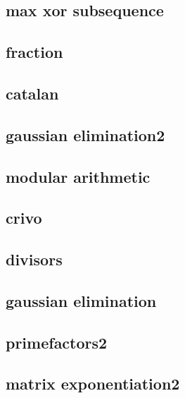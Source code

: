 \subsection{max xor subsequence}
\raggedbottom
\hrulefill
\subsection{fraction}
\raggedbottom
\hrulefill
\subsection{catalan}
\raggedbottom
\hrulefill
\subsection{gaussian elimination2}
\raggedbottom
\hrulefill
\subsection{modular arithmetic}
\raggedbottom
\hrulefill
\subsection{crivo}
\raggedbottom
\hrulefill
\subsection{divisors}
\raggedbottom
\hrulefill
\subsection{gaussian elimination}
\raggedbottom
\hrulefill
\subsection{primefactors2}
\raggedbottom
\hrulefill
\subsection{matrix exponentiation2}
\raggedbottom
\hrulefill
